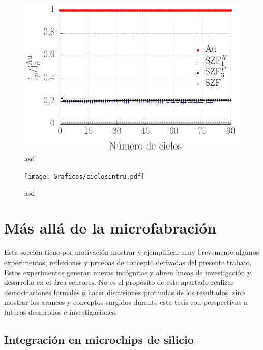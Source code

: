 {		\begin{figure}[ht!]
		 	       	\begin{center}
		 	       	\includegraphics[width=\textwidth]{Graficos/ciclosintfecn.pdf}
		        	\caption[asd]{asd}
		         	\end{center}
		     		\end{figure}
		     		
		\begin{figure}[ht!]
		 	       	\begin{center}
		 	       	\texttt{[image: Graficos/ciclosintru.pdf]}
		        	\caption[asd]{asd}
		         	\end{center}
		     		\end{figure}
		     		     		     		


\section{Más allá de la microfabración}
	
	  Esta sección tiene por motivación mostrar y ejemplificar muy brevemente algunos experimentos, reflexiones y pruebas de concepto derivadas del presente trabajo. Estos experimentos generan nuevas incógnitas y abren lineas de investigación y desarrollo en el área sensores. No es el propósito de este apartado realizar demostraciones formales o hacer discusiones profundas de los resultados, sino mostrar los avances y conceptos surgidos durante esta tesis con perspectivas a futuros desarrollos e investigaciones.

	\subsection{Integración en microchips de silicio}

}
